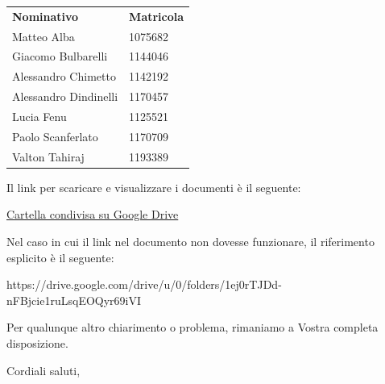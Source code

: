 \documentclass[12pt]{letter}
\begin{document}
\begin{letter}{ }
\begin{center}
   \centering
   \begin{tabular}{ll}
     \textbf{Nominativo}        & \textbf{Matricola} \\
     Matteo Alba                     &  1075682 \\
	 Giacomo Bulbarelli              &  1144046 \\
	 Alessandro Chimetto             &  1142192 \\
	 Alessandro Dindinelli           &  1170457 \\
	 Lucia Fenu                      &  1125521 \\
     Paolo Scanferlato               &  1170709 \\
     Valton Tahiraj                  &  1193389 \\
   \end{tabular}
 \end{center}

Il link per scaricare e visualizzare i documenti è il seguente:

\begin{center}
\href{https://drive.google.com/drive/u/0/folders/1ej0rTJDd-nFBjcie1ruLsqEOQyr69iVI}{Cartella condivisa su Google Drive}
\end{center}

Nel caso in cui il link nel documento non dovesse funzionare, il riferimento esplicito è il seguente:
\begin{center}
https://drive.google.com/drive/u/0/folders/1ej0rTJDd-nFBjcie1ruLsqEOQyr69iVI
\end{center}


Per qualunque altro chiarimento o problema, rimaniamo a Vostra completa disposizione.

\closing{Cordiali saluti,}

\vspace{3em}

\end{letter}
\end{document}
